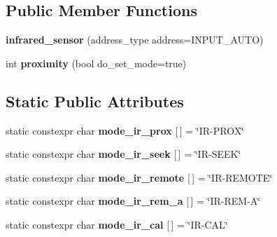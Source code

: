 \subsection*{Public Member Functions}
\begin{DoxyCompactItemize}
\item 
\mbox{\label{classev3dev_1_1infrared__sensor_aab5f08bf36b7eb510b5b4f500a7ce895}} 
{\bfseries infrared\+\_\+sensor} (address\+\_\+type address=I\+N\+P\+U\+T\+\_\+\+A\+U\+TO)
\item 
\mbox{\label{classev3dev_1_1infrared__sensor_ad0d365c74eadf658a9fbbf95da355670}} 
int {\bfseries proximity} (bool do\+\_\+set\+\_\+mode=true)
\end{DoxyCompactItemize}
\subsection*{Static Public Attributes}
\begin{DoxyCompactItemize}
\item 
\mbox{\label{classev3dev_1_1infrared__sensor_ae2326817d0a2ea0209258ed1cac63b2c}} 
static constexpr char {\bfseries mode\+\_\+ir\+\_\+prox} \mbox{[}$\,$\mbox{]} = \char`\"{}IR-\/P\+R\+OX\char`\"{}
\item 
\mbox{\label{classev3dev_1_1infrared__sensor_acca2f91c1173c3b8baccc8ea26969335}} 
static constexpr char {\bfseries mode\+\_\+ir\+\_\+seek} \mbox{[}$\,$\mbox{]} = \char`\"{}IR-\/S\+E\+EK\char`\"{}
\item 
\mbox{\label{classev3dev_1_1infrared__sensor_ae916b4131ff410b4e78c2d11c41c58fd}} 
static constexpr char {\bfseries mode\+\_\+ir\+\_\+remote} \mbox{[}$\,$\mbox{]} = \char`\"{}IR-\/R\+E\+M\+O\+TE\char`\"{}
\item 
\mbox{\label{classev3dev_1_1infrared__sensor_ab1028a8e96c68e60a38d44ae93512bab}} 
static constexpr char {\bfseries mode\+\_\+ir\+\_\+rem\+\_\+a} \mbox{[}$\,$\mbox{]} = \char`\"{}IR-\/R\+EM-\/A\char`\"{}
\item 
\mbox{\label{classev3dev_1_1infrared__sensor_a5733586a6e9f7285d9b6703585908e25}} 
static constexpr char {\bfseries mode\+\_\+ir\+\_\+cal} \mbox{[}$\,$\mbox{]} = \char`\"{}IR-\/C\+AL\char`\"{}
\end{DoxyCompactItemize}
